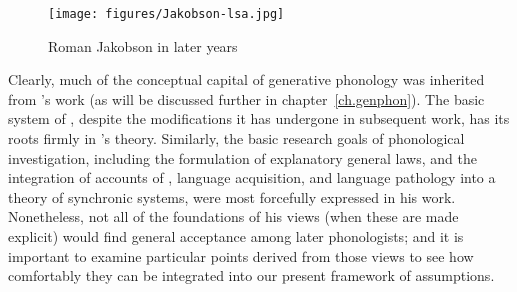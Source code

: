 \begin{wrapfigure}[12]{l}{.32\textwidth}
  \texttt{[image: figures/Jakobson-lsa.jpg]}
  \caption{Roman Jakobson in later years}
  \label{fig:ch.jakobson_jakobson_lsa}
\end{wrapfigure}
Clearly, much of the conceptual capital of generative phonology was
inherited from {\Jakobson}'s work (as will be discussed further in
chapter~\ref{ch.genphon}). The basic system of ,
despite the modifications it has undergone in subsequent work, has its
roots firmly in {\Jakobson}'s theory. Similarly, the basic research goals
of phonological investigation, including the formulation of
explanatory general laws, and the integration of accounts of
, language acquisition, and language pathology into a
theory of synchronic systems, were most forcefully expressed in his
work. Nonetheless, not all of the foundations of his views (when these
are made explicit) would find general acceptance among later
phonologists; and it is important to examine particular points derived
from those views to see how comfortably they can be integrated into
our present framework of assumptions.

